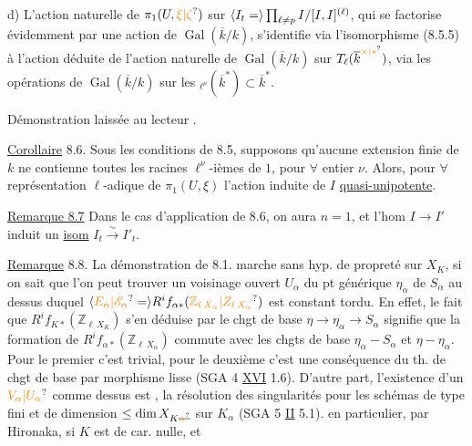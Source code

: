 d) L'action naturelle de $\pi_1(U,\unsure{\xi|\zeta})$ sur $\inserted{I_t=}\prod_{\ell\ne p}I/[I,I]^{(\ell)}$, qui se factorise  évidemment par une action de $\operatorname{Gal}(\overline k/k)$, s'identifie via l'isomorphisme (8.5.5) à l'action  déduite de l'action naturelle de $\operatorname{Gal}(\overline k/k)$ sur $T_\ell(\overline k^{\unsure{\times|*}})$,  via les opérations de $\operatorname{Gal}(\overline k/k)$ sur les ${}_{\ell^\nu}(\overline k^*)\subset\overline k^*$.

Démonstration laissée au lecteur \unsure{---}.

\uline{Corollaire} 8.6. Sous les conditions de 8.5, supposons qu'aucune extension finie de $k$ ne contienne toutes les racines $\ell^\nu$-ièmes de $1$, pour $\forall$ entier $\nu$. Alors, pour $\forall$ représentation $\ell$-adique de $\pi_1(U,\xi)$  l'action induite de $I$   \uline{quasi-unipotente}.

\uline{Remarque 8.7}  Dans le cas d'application de 8.6, on aura
$n=1$, et l'hom $I\longrightarrow I'$ induit un \uline{isom} $I_t\xrightarrow{\sim}I'_t$.

\uline{Remarque}  8.8. La démonstration de 8.1. marche sans hyp. de propreté sur $X_K$, si on sait que l'on peut trouver un voisinage ouvert $U_\alpha$ du pt générique $\eta_\alpha$ de $S_\alpha$
au dessus duquel $\inserted{\unsure{E_\alpha|\mathscr E_\alpha}=}R^if_{\alpha *}(\unsure{\mathbb Z_{\ell\,X_\alpha}|Z_{\ell\,X_\alpha}})$ est constant tordu. En effet, le fait que  $R^if_{K*}(\mathbb Z_{\ell\,X_K})$ s'en déduise par le chgt de base $\eta\longrightarrow\eta_\alpha\longrightarrow S_\alpha$ signifie que la formation de $R^if_{\alpha *}(\mathbb Z_{\ell\,X_\alpha})$ commute avec les chgts de base $\eta_\alpha-S_\alpha$ et $\eta-\eta_\alpha$. Pour le premier c'est trivial, pour le deuxième c'est une conséquence du th. de chgt de base  par morphisme lisse (SGA 4 \uline{XVI} 1.6). 
D'autre part, l'existence d'un $\unsure{V_\alpha|U_\alpha}$ comme dessus est ,  la résolution des singularités  pour les schémas de type fini et de dimension $\leq\dim X_{K\deleted{\unsure{\alpha}}}$ sur $K_\alpha$ (SGA 5 \uline{II} 5.1).   en particulier, par Hironaka, si $K$ est de car. nulle, et  

